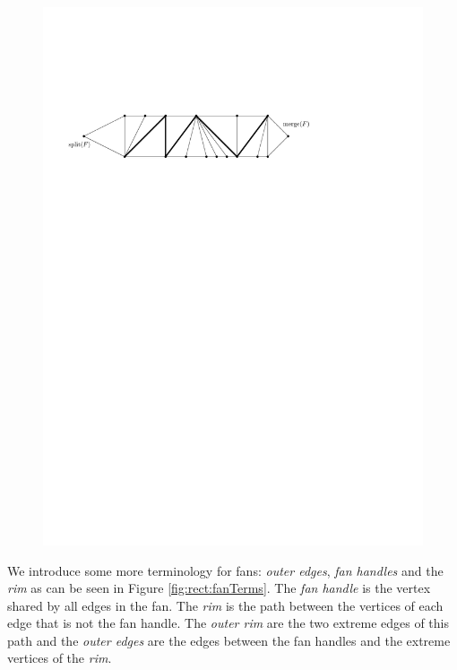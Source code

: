     \begin{figure}[h]
      \centering
      \includegraphics[scale=.9]{rectangularDuals/img/fans}
      \caption{}
      \label{fig:uni:fans}
    \end{figure}


   We introduce some more terminology for fans: \emph{outer edges}, \emph{fan handles} and the \emph{rim} as can be seen in Figure \ref{fig:rect:fanTerms}. The \emph{fan handle} is the vertex shared by all edges in the fan. The \emph{rim} is the path between the vertices of each edge that is not the fan handle. The \emph{outer rim} are the two extreme edges of this path and the \emph{outer edges} are the edges between the fan handles and the extreme vertices of the \emph{rim}.

